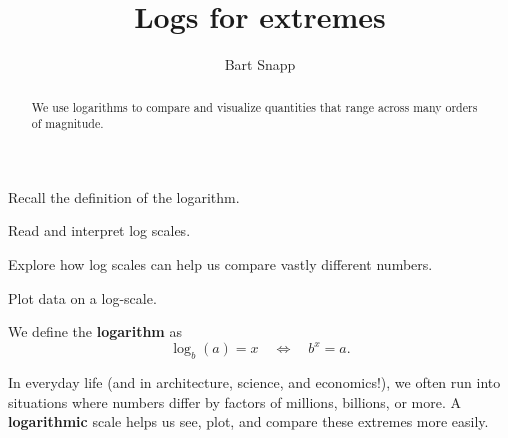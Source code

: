 \documentclass[noauthor,nooutcomes,handout,hints,12pt]{ximera}
\author{Bart Snapp}
\title{Logs for extremes}
\begin{document}
\begin{abstract}
    We use logarithms to compare and visualize quantities that range
    across many orders of magnitude.
\end{abstract}
\maketitle

\begin{listOutcomes}
    \item Recall the definition of the logarithm.
    \item Read and interpret log scales.
    \item Explore how log scales can help us compare vastly different numbers.
    \item Plot data on a log-scale.
\end{listOutcomes}

\begin{definition}
    We define the \textbf{logarithm} as
    \[
        \log_b(a) = x
        \quad\Leftrightarrow\quad
        b^x = a.
    \]
\end{definition}

In everyday life (and in architecture, science, and economics!), we
often run into situations where numbers differ by factors of millions,
billions, or more. A \textbf{logarithmic} scale helps us see, plot,
and compare these extremes more easily.

\mynewpage
\end{document}
